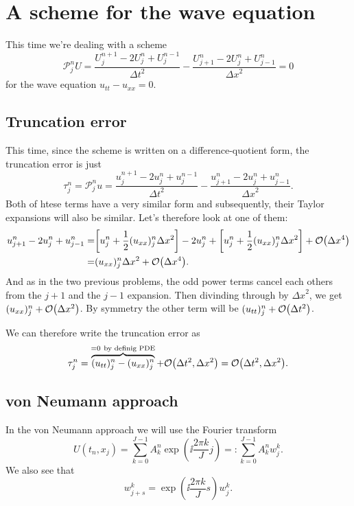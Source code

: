 \documentclass[11pt,letter, swedish, english
]{article}
\newcommand{\Dx}{\ensuremath{\Delta{x}}}
\newcommand{\Dt}{\ensuremath{\Delta{t}}}
\begin{document}
\section{A scheme for the wave equation}
This time we're dealing with a scheme
\begin{equation}\label{eq:3_start}
\mathcal{P}_j^nU=\frac{U_j^{n+1}-2U_j^{n}+U_j^{n-1}}{\Dt^2}
-\frac{U_{j+1}^{n}-2U_j^{n}+U_{j-1}^{n}}{\Dx^2}=0
\end{equation}
for the wave equation $u_{tt}-u_{xx}=0$.

\subsection{Truncation error}
This time, since the scheme is written on a difference-quotient form,
the truncation error is just
\begin{equation}
\tau_j^n=\mathcal{P}_j^nu
=\frac{u_j^{n+1}-2u_j^{n}+u_j^{n-1}}{\Dt^2}
-\frac{u_{j+1}^{n}-2u_j^{n}+u_{j-1}^{n}}{\Dx^2}.
\end{equation}
Both of htese terms have a very similar form and subsequently, their
Taylor expansions will also be similar. Let's therefore look at one of
them:
\begin{equation}
\begin{aligned}
u_{j+1}^{n}-2u_j^{n}+u_{j-1}^{n}=&
\qty[u_j^n+\frac{1}{2}(u_{xx})_j^n\Dx^2]-2u_j^n
+\qty[u_j^n+\frac{1}{2}(u_{xx})_j^n\Dx^2]+\order{\Dx^4}\\
=&(u_{xx})_j^n\Dx^2+\order{\Dx^4}.
\end{aligned}
\end{equation}
And as in the two previous problems, the odd power terms cancel each
others from the $j+1$ and the $j-1$ expansion. Then divinding through
by $\Dx^2$, we get $(u_{xx})_j^n+\order{\Dx^2}$.
By symmetry the other term will be $(u_{tt})_j^n+\order{\Dt^2}$.

We can therefore write the truncation error as
\begin{equation}
\tau_j^n=
\overbrace{(u_{tt})_j^n-(u_{xx})_j^n}^{=0\ \text{by definig PDE}}
+\order{\Dt^2, \Dx^2}=\order{\Dt^2, \Dx^2}.
\end{equation}

\subsection{von Neumann approach}
In the von Neumann approach we will use the Fourier transform
\begin{equation}\label{eq:3_FT}
U(t_n,x_j)=\sum_{k=0}^{J-1} A_k^n\exp(\ii\frac{2\pi k}{J}j)
=:\sum_{k=0}^{J-1} A_k^nw_j^k.
\end{equation}
We also see that
\begin{equation}
w_{j+s}^k=\exp(\ii\frac{2\pi k}{J}s)w_j^k.
\end{equation}
\end{document}
